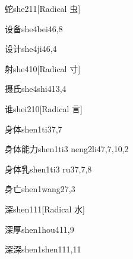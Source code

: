 \begin{entry}{蛇}{she2}{11}[Radical 虫]
\end{entry}

\begin{entry}{设备}{she4bei4}{6,8}
\end{entry}

\begin{entry}{设计}{she4ji4}{6,4}
\end{entry}

\begin{entry}{射}{she4}{10}[Radical 寸]
\end{entry}

\begin{entry}{摄氏}{she4shi4}{13,4}
\end{entry}

\begin{entry}{谁}{shei2}{10}[Radical 言]
\end{entry}

\begin{entry}{身体}{shen1ti3}{7,7}
\end{entry}

\begin{entry}{身体能力}{shen1ti3 neng2li4}{7,7,10,2}
\end{entry}

\begin{entry}{身体乳}{shen1ti3 ru3}{7,7,8}
\end{entry}

\begin{entry}{身亡}{shen1wang2}{7,3}
\end{entry}

\begin{entry}{深}{shen1}{11}[Radical 水]
\end{entry}

\begin{entry}{深厚}{shen1hou4}{11,9}
\end{entry}

\begin{entry}{深深}{shen1shen1}{11,11}
\end{entry}

